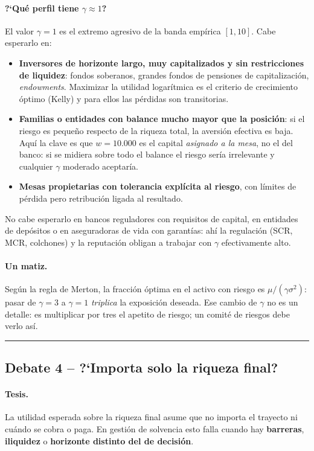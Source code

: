 \documentclass[a4paper,12pt]{article}
\begin{document}
\paragraph{?`Qu\'e perfil tiene $\gamma\approx1$?} El valor $\gamma=1$ es el extremo agresivo de la banda emp\'irica $[1,10]$. Cabe esperarlo en:
\begin{itemize}[leftmargin=*,itemsep=1pt]
\item \textbf{Inversores de horizonte largo, muy capitalizados y sin restricciones de liquidez}: fondos soberanos, grandes fondos de pensiones de capitalizaci\'on, \emph{endowments}. Maximizar la utilidad logar\'itmica es el criterio de crecimiento \'optimo (Kelly) y para ellos las p\'erdidas son transitorias.
\item \textbf{Familias o entidades con balance mucho mayor que la posici\'on}: si el riesgo es peque\~no respecto de la riqueza total, la aversi\'on efectiva es baja. Aqu\'i la clave es que $w=10.000$ es el capital \emph{asignado a la mesa}, no el del banco: si se midiera sobre todo el balance el riesgo ser\'ia irrelevante y cualquier $\gamma$ moderado aceptar\'ia.
\item \textbf{Mesas propietarias con tolerancia expl\'icita al riesgo}, con l\'imites de p\'erdida pero retribuci\'on ligada al resultado.
\end{itemize}
No cabe esperarlo en bancos reguladores con requisitos de capital, en entidades de dep\'ositos o en aseguradoras de vida con garant\'ias: ah\'i la regulaci\'on (SCR, MCR, colchones) y la reputaci\'on obligan a trabajar con $\gamma$ efectivamente alto.

\paragraph{Un matiz.} Seg\'un la regla de Merton, la fracci\'on \'optima en el activo con riesgo es $\mu/(\gamma\sigma^2)$: pasar de $\gamma=3$ a $\gamma=1$ \emph{triplica} la exposici\'on deseada. Ese cambio de $\gamma$ no es un detalle: es multiplicar por tres el apetito de riesgo; un comit\'e de riesgos debe verlo as\'i.

\bigskip\hrule\bigskip

\subsection{Debate 4 -- ?`Importa solo la riqueza final?}

\paragraph{Tesis.} La utilidad esperada sobre la riqueza final asume que no importa el trayecto ni cu\'ando se cobra o paga. En gesti\'on de solvencia esto falla cuando hay \textbf{barreras}, \textbf{iliquidez} o \textbf{horizonte distinto del de decisi\'on}.
\end{document}
